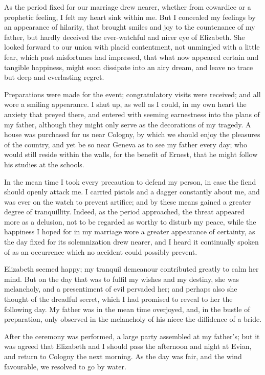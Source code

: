 As the period fixed for our marriage
drew nearer, whether from cowardice
or a prophetic feeling, I felt my heart
sink within me. But I concealed my
feelings by an appearance of hilarity,
that brought smiles and joy to the countenance
of my father, but hardly deceived
the ever-watchful and nicer eye
of Elizabeth. She looked forward to
our union with placid contentment, not
unmingled with a little fear, which past
misfortunes had impressed, that what
now appeared certain and tangible
happiness, might soon dissipate into
an airy dream, and leave no trace but
deep and everlasting regret.

Preparations were made for the event;
congratulatory visits were received;
and all wore a smiling appearance. I
shut up, as well as I could, in my own
heart the anxiety that preyed there, and
entered with seeming earnestness into
the plans of my father, although they
might only serve as the decorations of
my tragedy. A house was purchased
for us near Cologny, by which we
should enjoy the pleasures of the
country, and yet be so near Geneva as
to see my father every day; who would
still reside within the walls, for the
benefit of Ernest, that he might follow
his studies at the schools.

In the mean time I took every
precaution to defend my person, in case
the fiend should openly attack me. I
carried pistols and a dagger constantly
about me, and was ever on the watch
to prevent artifice; and by these means
gained a greater degree of tranquillity.
Indeed, as the period approached, the
threat appeared more as a delusion, not
to be regarded as worthy to disturb my
peace, while the happiness I hoped for
in my marriage wore a greater appearance
of certainty, as the day fixed for
its solemnization drew nearer, and I
heard it continually spoken of as an
occurrence which no accident could
possibly prevent.

Elizabeth seemed happy; my tranquil
dem\-eanour contributed greatly
to calm her mind. But on the day
that was to fulfil my wishes and
my destiny, she was melancholy, and
a presentiment of evil pervaded her;
and perhaps also she thought of the
dreadful secret, which I had promised
to reveal to her the following day. My
father was in the mean time overjoyed,
and, in the bustle of preparation, only
observed in the melancholy of his niece
the diffidence of a bride.

After the ceremony was performed,
a large party assembled at my father's;
but it was agreed that Elizabeth and I
should pass the afternoon and night at
Evian, and return to Cologny the next
morning. As the day was fair, and the
wind favourable, we resolved to go by
water.

